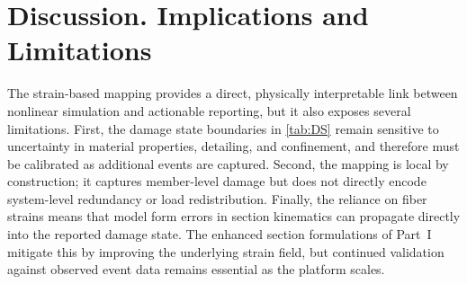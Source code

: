 



\section{Discussion. Implications and Limitations}\label{sec:t1-discussion}
The strain-based mapping provides a direct, physically interpretable link between nonlinear simulation and actionable reporting, but it also exposes several limitations. 
First, the damage state boundaries in \cref{tab:DS} remain sensitive to uncertainty in material properties, detailing, and confinement, and therefore must be calibrated as additional events are captured. 
Second, the mapping is local by construction; it captures member-level damage but does not directly encode system-level redundancy or load redistribution. 
Finally, the reliance on fiber strains means that model form errors in section kinematics can propagate directly into the reported damage state. 
The enhanced section formulations of Part~I mitigate this by improving the underlying strain field, but continued validation against observed event data remains essential as the platform scales.


